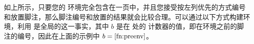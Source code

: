 % 


% 

如上所示，只要您的  环境完全包含在一页中，并且您接受按左列优先的方式编号和放置脚注，那么脚注编号和放置的结果就会比较合理。可以通过以下方式构建环境，利用  是全局的这一事实，其中 $b$ 是在 \beginparacol 处的  计数器的值，即在环境之前的脚注的编号，因此在上面的示例中 $b=\ref{fn:preenv}$。

